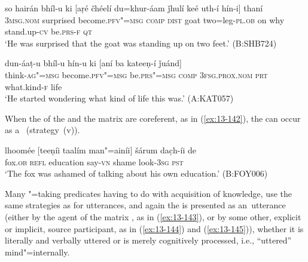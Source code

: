 \begin{exe}
\ex
\label{ex:13-140}
\gll so hairán bhíl-u ki [aṛé čhéelí  du=khur-áam ǰhulí keé uth-í hín-i] thaní \\
\textsc{3msg.nom}  surprised become.\textsc{pfv"=msg} \textsc{comp} \textsc{dist} goat  two=leg-\textsc{pl.ob} on why stand.up-\textsc{cv} be.\textsc{prs-f} \textsc{qt} \\
\glt `He was surprised that the goat was standing up on two feet.' (B:SHB724)

\ex
\label{ex:13-141}
\gll dun-áaṭ-u bhíl-u hín-u ki  [aní ba kateeṇ-í ǰuánd] \\
think-\textsc{ag"=msg} become.\textsc{pfv"=msg} be.\textsc{prs"=msg} \textsc{comp}  \textsc{3fsg.prox.nom} \textsc{prt} what.kind-\textsc{f} life  \\
\glt `He started wondering what kind of life this was.' (A:KAT057) 
\end{exe}

When the  of the  and the matrix  are coreferent, as in (\ref{ex:13-142}), the  can occur as a~ (strategy~(v)).

\begin{exe}
\ex
\label{ex:13-142}
\gll lhoomée [teeṇíi taalím man"=ainíi] šárum  dac̣h-íi de \\
fox.\textsc{ob} \textsc{ refl} education say-\textsc{vn} shame look-\textsc{3sg} \textsc{pst} \\
\glt `The fox was ashamed of talking about his own education.' (B:FOY006) 
\end{exe}

 Many "=taking predicates having to do with acquisition of knowledge, use the same strategies as for utterances, and again the  is presented as an~utterance (either by the agent of the matrix , as in (\ref{ex:13-143}), or by some other, explicit or implicit, source participant, as in (\ref{ex:13-144}) and (\ref{ex:13-145})), whether it is literally and verbally uttered or is merely cognitively processed, i.e., ``uttered'' mind"=internally. 


